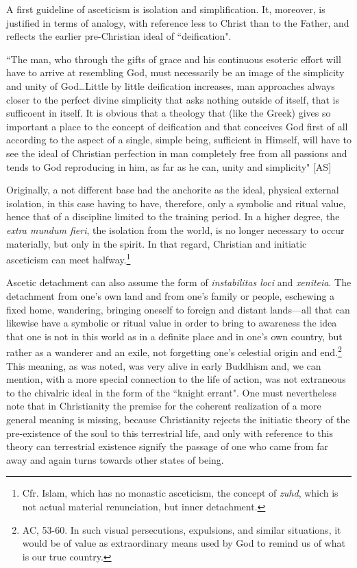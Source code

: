 A first guideline of asceticism is isolation and simplification. It, moreover, is justified in terms of analogy, with reference less to Christ than to the Father, and reflects the earlier pre-Christian ideal of ``deification".

``The man, who through the gifts of grace and his continuous esoteric effort will have to arrive at resembling God, must necessarily be an image of the simplicity and unity of God…Little by little deification increases, man approaches always closer to the perfect divine simplicity that asks nothing outside of itself, that is sufficoent in itself. It is obvious that a theology that (like the Greek) gives so important a place to the concept of deification and that conceives God first of all according to the aspect of a single, simple being, sufficient in Himself, will have to see the ideal of Christian perfection in man completely free from all passions and tends to God reproducing in him, as far as he can, unity and simplicity" [AS]

Originally, a not different base had the anchorite as the ideal, physical external isolation, in this case having to have, therefore, only a symbolic and ritual value, hence that of a discipline limited to the training period. In a higher degree, the \textit{extra mundum fieri}, the isolation from the world, is no longer necessary to occur materially, but only in the spirit. In that regard, Christian and initiatic asceticism can meet halfway.\footnote{Cfr. Islam, which has no monastic asceticism, the concept of \textit{zuhd}, which is not actual material renunciation, but inner detachment.}

Ascetic detachment can also assume the form of \textit{instabilitas loci} and \textit{xeniteia}. The detachment from one's own land and from one's family or people, eschewing a fixed home, wandering, bringing oneself to foreign and distant lands—all that can likewise have a symbolic or ritual value in order to bring to awareness the idea that one is not in this world as in a definite place and in one's own country, but rather as a wanderer and an exile, not forgetting one's celestial origin and end.\footnote{AC, 53-60. In such visual persecutions, expulsions, and similar situations, it would be of value as extraordinary means used by God to remind us of what is our true country.} This meaning, as was noted, was very alive in early Buddhism and, we can mention, with a more special connection to the life of action, was not extraneous to the chivalric ideal in the form of the ``knight errant". One must nevertheless note that in Christianity the premise for the coherent realization of a more general meaning is missing, because Christianity rejects the initiatic theory of the pre-existence of the soul to this terrestrial life, and only with reference to this theory can terrestrial existence signify the passage of one who came from far away and again turns towards other states of being.

